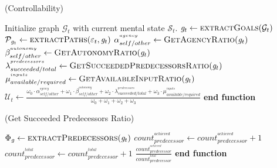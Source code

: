 \documentclass{article}
\begin{document}
\begin{algorithm}
	\caption{(Controllability)}
	\label{array-sum}
	\begin{algorithmic}[1]
			\Statex
			\State Initialize graph $\mathcal{G}_{t}$ with current mental state
			$\mathcal{S}_{t}$.
			\Statex
			\State $\mathit{g}_{t} \gets \Call{extractGoals}{\mathcal{G}_{t}}$ 
			\State $\mathcal{P}_{\mathit{g}_{t}} \gets \Call{extractPaths}{\varepsilon_t,
			\mathit{g}_{t}}$
			\Statex
			\State $\alpha_{self/other}^{^{agency}} \gets
			\Call{GetAgencyRatio}{\mathit{g}_{t}}$ 
			\Statex
			\State $\beta_{self/other}^{^{autonomy}} \gets
			\Call{GetAutonomyRatio}{\mathit{g}_{t}}$
			\Statex
			\State $\lambda_{succeeded/total}^{^{predecessors}} \gets
			\Call{GetSucceededPredecessorsRatio}{\mathit{g}_{t}}$
			\Statex
			\State $\mu_{available/required}^{^{inputs}} \gets
			\Call{GetAvailableInputRatio}{\mathit{g}_{t}}$
			\Statex
			\State $\mathcal{U}_{t} \gets
			\frac{\omega_{0}\cdot \alpha_{self/other}^{^{agency}} +
			\omega_{1}\cdot \beta_{self/other}^{^{autonomy}} + \omega_{2}\cdot
			\lambda_{succeeded/total}^{^{predecessors}} + \omega_{3}\cdot
			\mu_{available/required}^{^{inputs}}}{\omega_{0} + \omega_{1} + \omega_{2} +
			\omega_{3}}$
			\Statex
				\State {}
			\Else
				\State {}
			\EndIf
		\EndFunction
		\State \textbf{end function}
		\end{algorithmic}
	\end{algorithm}
	
\pagebreak
	
\begin{algorithm}
	\caption{(Get Succeeded Predecessors Ratio)}
	\label{array-sum}
	\begin{algorithmic}[1]
			\Statex
			\State $\Phi_{\mathit{g}} \gets
			\Call{extractPredecessors}{\mathit{g}_t}$
			\Statex
					\State $count_{predecessor}^{^{achieved}} \gets
					count_{predecessor}^{^{achieved}} + 1$
				\EndIf
				\State $count_{predecessor}^{^{total}} \gets count_{predecessor}^{^{total}} + 1$
			\EndFor
			\Statex
			\State \Return
			$\frac{count_{predecessor}^{^{achieved}}}{count_{predecessor}^{^{total}}}$
		\EndFunction 
	\State \textbf{end function}
	\end{algorithmic}
\end{algorithm}
\end{document}
